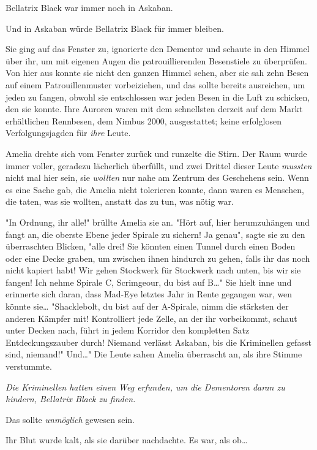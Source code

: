 {Bellatrix Black war immer noch in Askaban.

Und in Askaban würde Bellatrix Black für immer bleiben.

Sie ging auf das Fenster zu, ignorierte den Dementor und schaute in den Himmel über ihr, um mit eigenen Augen die patrouillierenden Besenstiele zu überprüfen. Von hier aus konnte sie nicht den ganzen Himmel sehen, aber sie sah zehn Besen auf einem Patrouillenmuster vorbeiziehen, und das sollte bereits ausreichen, um jeden zu fangen, obwohl sie entschlossen war jeden Besen in die Luft zu schicken, den sie konnte. Ihre Auroren waren mit dem schnellsten derzeit auf dem Markt erhältlichen Rennbesen, dem Nimbus 2000, ausgestattet; keine erfolglosen Verfolgungsjagden für \emph{ihre} Leute.

Amelia drehte sich vom Fenster zurück und runzelte die Stirn. Der Raum wurde immer voller, geradezu lächerlich überfüllt, und zwei Drittel dieser Leute \emph{mussten} nicht mal hier sein, sie \emph{wollten} nur nahe am Zentrum des Geschehens sein. Wenn es eine Sache gab, die Amelia nicht tolerieren konnte, dann waren es Menschen, die taten, was sie wollten, anstatt das zu tun, was nötig war.

"In Ordnung, ihr alle!" brüllte Amelia sie an. "Hört auf, hier herumzuhängen und fangt an, die oberste Ebene jeder Spirale zu sichern! Ja genau", sagte sie zu den überraschten Blicken, "alle drei! Sie könnten einen Tunnel durch einen Boden oder eine Decke graben, um zwischen ihnen hindurch zu gehen, falls ihr das noch nicht kapiert habt! Wir gehen Stockwerk für Stockwerk nach unten, bis wir sie fangen! Ich nehme Spirale C, Scrimgeour, du bist auf B…" Sie hielt inne und erinnerte sich daran, dass Mad-Eye letztes Jahr in Rente gegangen war, wen könnte sie… "Shacklebolt, du bist auf der A-Spirale, nimm die stärksten der anderen Kämpfer mit! Kontrolliert jede Zelle, an der ihr vorbeikommt, schaut unter Decken nach, führt in jedem Korridor den kompletten Satz Entdeckungszauber durch! Niemand verlässt Askaban, bis die Kriminellen gefasst sind, niemand!" Und…" Die Leute sahen Amelia überrascht an, als ihre Stimme verstummte.

\emph{\emph{Die Kriminellen hatten einen Weg erfunden, um die Dementoren daran zu hindern, Bellatrix Black zu finden.}}

Das sollte \emph{unmöglich} gewesen sein.

Ihr Blut wurde kalt, als sie darüber nachdachte. Es war, als ob…

}
